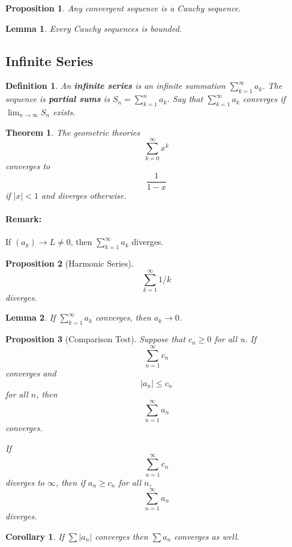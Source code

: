 \documentclass[12pt]{article}
\newtheorem{definition}{Definition}[subsection]
\newtheorem{theorem}{Theorem}[subsection]
\newtheorem{proposition}{Proposition}[subsection]
\newtheorem{lemma}{Lemma}[subsection]
\newtheorem{corollary}{Corollary}[subsection]
\begin{document}
			\begin{proposition}
				Any convergent sequence is a Cauchy sequence.
			\end{proposition}
			
			\begin{lemma}
				Every Cauchy sequences is bounded.
			\end{lemma}
			
			\subsection{Infinite Series}
			\begin{definition}
				An \textbf{infinite series} is an infinite summation $\sum_{k = 1}^{\infty}a_k$. The sequence is \textbf{partial sums} is $S_n = \sum_{k = 1}^n a_k$. Say that $\sum_{k = 1}^{\infty} a_k$ converges if $\lim_{n \rightarrow \infty} S_n$ exists.
			\end{definition}
			\begin{theorem}
				The geometric theories
				\[\sum_{k=0}^{\infty}x^k\]
				converges to \[\frac{1}{1 - x}\] if $|x| < 1$ and diverges otherwise.
			\end{theorem}
			
			\paragraph{Remark:} If $(a_k) \rightarrow L \neq 0$, then $\sum_{k = 1}^{\infty} a_k$ diverges.
			\begin{proposition}[Harmonic Series]
				\[\sum_{k = 1}^{\infty} 1/k\] diverges.
			\end{proposition}
			\begin{lemma}
				If $\sum_{k = 1}^{\infty} a_k$ converges, then $a_k \rightarrow 0$.
			\end{lemma}
			
			\begin{proposition}[Comparison Test]
				Suppose that $c_n \geq 0$ for all n. If \[\sum_{n = 1}^{\infty}c_n\] converges and \[|a_n| \leq c_n\] for all $n$, then \[\sum_{n = 1}^{\infty} a_n\] converges.
				
				If \[\sum_{n = 1}^{\infty}c_n\] diverges to $\infty$, then if $a_n \geq c_n$ for all $n$, \[\sum_{n = 1}^{\infty} a_n\] diverges.
			\end{proposition}
			
			\begin{corollary}
				If $\sum |a_n|$ converges then $\sum a_n$ converges as well.
			\end{corollary}
			
\end{document}
